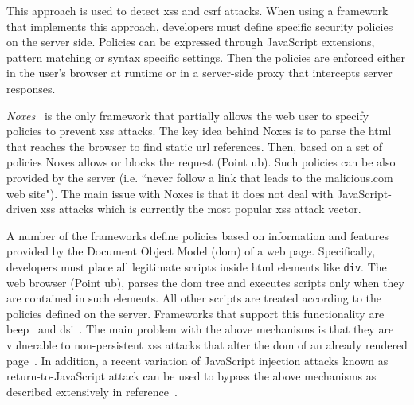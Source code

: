 \documentclass[conference]{IEEEtran}
\begin{document}
This approach is used to detect {\sc xss} and {\sc csrf} attacks.
When using a framework that implements
this approach, developers must define
specific security policies on the server side.
Policies can be expressed through JavaScript extensions,
pattern matching or syntax specific settings.
Then the policies are enforced either in the user's
browser at runtime or in a server-side proxy that intercepts
server responses.

{\it Noxes}~\cite{KKVJ06,KJKV09} is the only
framework that partially allows the web
user to specify policies to prevent {\sc xss} attacks.
The key idea behind Noxes is to parse
the {\sc html} that reaches the browser to
find static {\sc url} references. Then, based on
a set of policies Noxes allows or blocks
the request (Point {\sc ub}). Such policies
can be also provided by the server (i.e. ``never
follow a link that leads to the malicious.com
web site"). The main issue with Noxes is that
it does not deal with JavaScript-driven {\sc xss}
attacks which is currently the most popular
{\sc xss} attack vector.

A number of the frameworks define policies
based on information and features provided by
the Document Object Model ({\sc dom}) of a web page.
Specifically, developers must place all legitimate
scripts inside {\sc html} elements like {\tt div}.
The web browser (Point {\sc ub}), parses the
{\sc dom} tree and executes scripts only when they
are contained in such elements. All other scripts
are treated according to the policies defined
on the server. Frameworks that support this
functionality are {\sc beep}~\cite{TNH07}
and {\sc dsi}~\cite{NSS06}. The main problem with
the above mechanisms is that they are vulnerable
to non-persistent {\sc xss} attacks that alter
the {\sc dom} of an already rendered
page~\cite{APKLM10}.
In addition, a recent variation of JavaScript
injection attacks known as return-to-JavaScript
attack can be used to bypass the above mechanisms
as described extensively in reference~\cite{APKLM10}.
\end{document}
